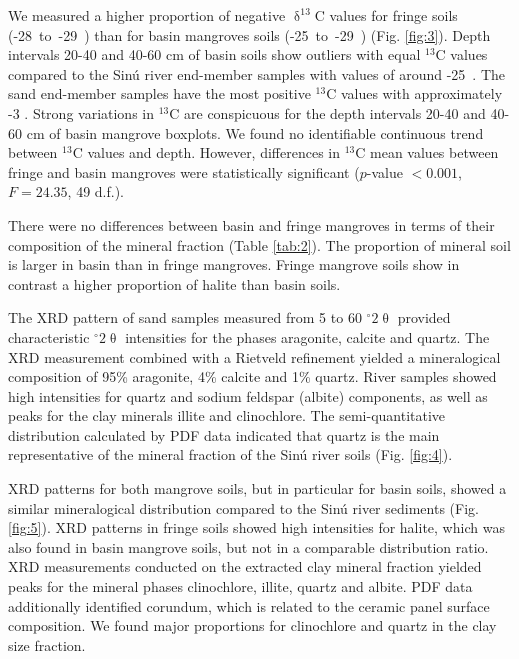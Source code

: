 We measured a higher proportion of negative $\updelta^{13}$C values for fringe soils \mbox{(-28 to -29 \permil)} than for basin mangroves soils \mbox{(-25 to -29 \permil)} (Fig. \ref{fig:3}).  Depth intervals 20-40 and 40-60 cm of basin soils show outliers with equal $^{13}$C values compared to the Sin\'{u} river end-member samples with values of around \mbox{-25 \permil}. The sand end-member samples have the most positive $^{13}$C values with approximately -3 \permil.  Strong variations in $^{13}$C are conspicuous for the depth intervals 20-40 and 40-60 cm of basin mangrove boxplots. We found no identifiable continuous trend between $^{13}$C values and depth. However, differences in $^{13}$C mean values between fringe and basin mangroves were statistically significant ($p$-value $< 0.001$, $F = 24.35$, 49 d.f.). 


There were no differences between basin and fringe mangroves in terms of their composition of the mineral fraction (Table \ref{tab:2}). The proportion of mineral soil is larger in basin than in fringe mangroves. Fringe mangrove soils show in contrast a higher proportion of halite than basin soils.

The XRD pattern of sand samples measured from 5 to 60 $^{\circ}2\uptheta$ provided characteristic $^{\circ}2\uptheta$ intensities for the phases aragonite, calcite and quartz. The XRD measurement combined with a Rietveld refinement yielded a mineralogical composition of 95\% aragonite, 4\% calcite and 1\% quartz.
River samples showed high intensities for quartz and sodium feldspar (albite) components, as well as peaks for the clay minerals illite and clinochlore. The semi-quantitative distribution calculated by PDF data indicated that quartz is the main representative of the mineral fraction of the Sin\'{u} river soils (Fig. \ref{fig:4}).

XRD patterns for both mangrove soils, but in particular for basin soils, showed a similar mineralogical distribution compared to the Sin\'{u} river sediments (Fig. \ref{fig:5}). XRD patterns in fringe soils showed high intensities for halite, which was also found in basin mangrove soils, but not in a comparable distribution ratio.
XRD measurements conducted on the extracted clay mineral fraction yielded peaks for the mineral phases clinochlore, illite, quartz and albite. PDF data additionally identified corundum, which is related to the ceramic panel surface composition. We found major proportions for clinochlore and quartz in the clay size fraction. 

